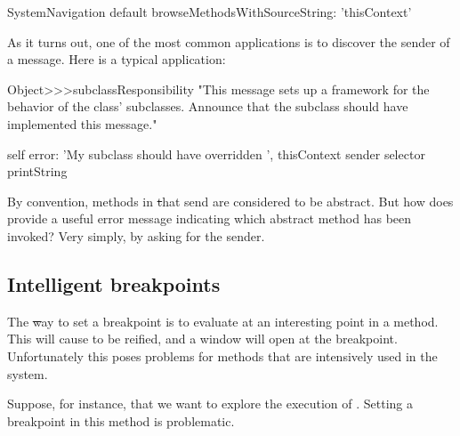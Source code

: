 \documentclass[a4paper,10pt,twoside]{book}
\begin{document}
\begin{code}{}
SystemNavigation default browseMethodsWithSourceString: 'thisContext'
\end{code}

As it turns out, one of the most common applications is to discover the sender of a message.
Here is a typical application:
\begin{code}{}
Object>>>subclassResponsibility
        "This message sets up a framework for the behavior of the class' subclasses.
        Announce that the subclass should have implemented this message."

        self error: 'My subclass should have overridden ', thisContext sender selector printString
\end{code}

By convention, methods in \st that send  are considered to be abstract.  But how does  provide a useful error message indicating which abstract method has been invoked?  Very simply, by asking  for the sender.

\subsection{Intelligent breakpoints}

The \st way to set a breakpoint is to evaluate  at an interesting point in a method.  This will cause  to be reified, and a  window will open at the breakpoint.
Unfortunately this poses problems for methods that are intensively used in the system.

Suppose, for instance, that we want to explore the execution of .
Setting a breakpoint in this method is problematic.
\end{document}
